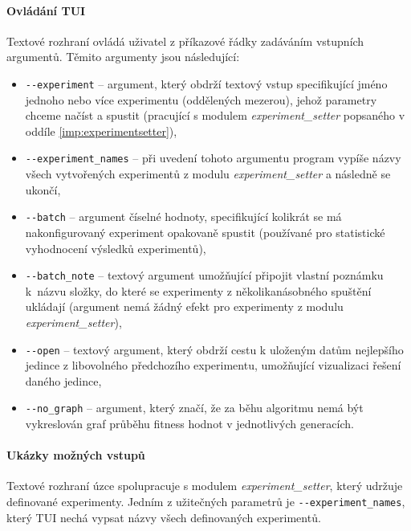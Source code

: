 \paragraph{Ovládání TUI} \label{doc_13_TUI_ovladani}
Textové rozhraní ovládá uživatel z příkazové řádky zadáváním vstupních
argumentů. Těmito argumenty jsou následující:

\begin{itemize}
    \item \texttt{-{}-experiment} -- argument, který obdrží textový vstup
        specifikující jméno jednoho nebo více experimentu (oddělených mezerou),
        jehož parametry chceme načíst a spustit (pracující s modulem
        \emph{experiment\_setter} popsaného v oddíle
        \ref{imp:experimentsetter}),
    \item \texttt{-{}-experiment\_names} -- při uvedení tohoto argumentu
        program vypíše názvy všech vytvořených experimentů z modulu
        \emph{experiment\_setter} a následně se ukončí,
    \item \texttt{-{}-batch} -- argument číselné hodnoty, specifikující
        kolikrát se má nakonfigurovaný experiment opakovaně spustit (používané
        pro statistické vyhodnocení výsledků experimentů),
    \item \texttt{-{}-batch\_note} -- textový argument umožňující připojit
        vlastní poznámku k~názvu složky, do které se experimenty z
        několikanásobného spuštění ukládají (argument nemá žádný efekt pro
        experimenty z modulu \\\emph{experiment\_setter}),
    \item \texttt{-{}-open} -- textový argument, který obdrží cestu k uloženým
        datům nejlepšího jedince z libovolného předchozího experimentu,
        umožňující vizualizaci řešení daného jedince,
    \item \texttt{-{}-no\_graph} -- argument, který značí, že za běhu algoritmu
        nemá být vykreslován graf průběhu fitness hodnot v jednotlivých
        generacích.
\end{itemize}

\paragraph{Ukázky možných vstupů}
Textové rozhraní úzce spolupracuje s modulem \emph{experiment\_setter}, který
udržuje definované experimenty. Jedním z užitečných parametrů je
\texttt{-{}-experiment\_names}, který TUI nechá vypsat názvy všech definovaných
experimentů.

